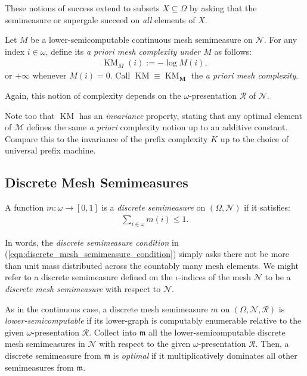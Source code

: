 These notions of success extend to subsets $X \subseteq \Omega$ by asking that the semimeasure or supergale succeed on \textit{all} elements of $X$.

\begin{definition}
    Let $M$ be a lower-semicomputable continuous mesh semimeasure on $\mathcal{N}$. For any index $i \in \omega$, define its \textit{a priori mesh complexity under $M$} as follows:
    \begin{align*}
        \operatorname{KM}_M(i) := - \log M(i),
    \end{align*}
    or $+\infty$ whenever $M(i) = 0$. Call $\operatorname{KM} \equiv \operatorname{KM}_{\mathbf{M}}$ the \textit{a priori mesh complexity}. 
\end{definition}

Again, this notion of complexity depends on the $\omega$-presentation $\mathscr{R}$ of $\mathcal{N}$.

Note too that $\operatorname{KM}$ has an \textit{invariance} property, stating that any optimal element of $\mathcal{M}$ defines the same \textit{a priori} complexity notion up to an additive constant. Compare this to the invariance of the prefix complexity $K$ up to the choice of universal prefix machine.

\subsection{Discrete Mesh Semimeasures}

\begin{definition}
    A function $m: \omega \to [0, 1]$ is a \textit{discrete semimeasure} on $(\Omega, \mathcal{N})$ if it satisfies:
    \begin{align}
         \sum_{i \in \omega} m(i) \leq 1.
        \label{eqn:discrete_mesh_semimeasure_condition}
    \end{align}
\end{definition}

In words, the \textit{discrete semimeasure condition} in (\ref{eqn:discrete_mesh_semimeasure_condition}) simply asks there not be more than unit mass distributed across the countably many mesh elements. We might refer to a discrete semimeasure defined on the $\iota$-indices of the mesh $\mathcal{N}$ to be a \textit{discrete mesh semimeasure} with respect to $\mathcal{N}$. 

As in the continuous case, a discrete mesh semimeasure $m$ on $(\Omega, \mathcal{N}, \mathscr{R})$ is \textit{lower-semicomputable} if its lower-graph is computably enumerable relative to the given $\omega$-presentation $\mathscr{R}$. Collect into $\mathfrak{m}$ all the lower-semicomputable discrete mesh semimeasures in $\mathcal{N}$ with respect to the given $\omega$-presentation $\mathscr{R}$. Then, a discrete semimeasure from $\mathfrak{m}$ is \textit{optimal} if it multiplicatively dominates all other semimeasures from $\mathfrak{m}$.


